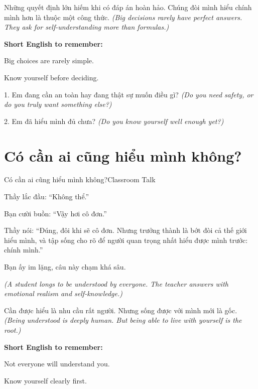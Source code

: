 \begin{baihoc}
Những quyết định lớn hiếm khi có đáp án hoàn hảo. Chúng đòi mình hiểu chính mình hơn là thuộc một công thức.
\textit{(Big decisions rarely have perfect answers. They ask for self-understanding more than formulas.)}
\end{baihoc}

\begin{ghinhoanh}
\textbf{Short English to remember:}

Big choices are rarely simple.

Know yourself before deciding.
\end{ghinhoanh}

\begin{tuhocnhanh}
1. Em đang cần an toàn hay đang thật sự muốn điều gì? \textit{(Do you need safety, or do you truly want something else?)}

2. Em đã hiểu mình đủ chưa? \textit{(Do you know yourself well enough yet?)}
\end{tuhocnhanh}
\ngancach

\section{Có cần ai cũng hiểu mình không?}
\begin{truyen}{Có cần ai cũng hiểu mình không?}{Classroom Talk}

Thầy lắc đầu: ``Không thể.''

Bạn cười buồn: ``Vậy hơi cô đơn.''

Thầy nói: ``Đúng, đôi khi sẽ cô đơn. Nhưng trưởng thành là bớt đòi cả thế giới hiểu mình, và tập sống cho rõ để người quan trọng nhất hiểu được mình trước: chính mình.''

Bạn ấy im lặng, câu này chạm khá sâu.

\textit{(A student longs to be understood by everyone. The teacher answers with emotional realism and self-knowledge.)}
\end{truyen}

\begin{baihoc}
Cần được hiểu là nhu cầu rất người. Nhưng sống được với mình mới là gốc.
\textit{(Being understood is deeply human. But being able to live with yourself is the root.)}
\end{baihoc}

\begin{ghinhoanh}
\textbf{Short English to remember:}

Not everyone will understand you.

Know yourself clearly first.
\end{ghinhoanh}

